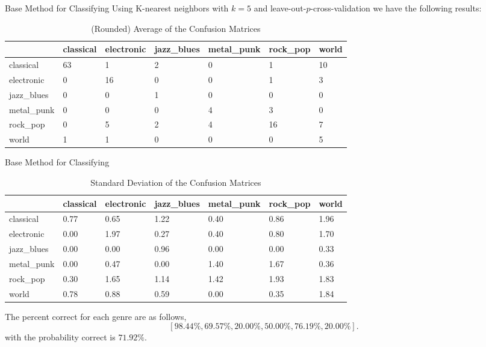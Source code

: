 \documentclass[xcolor=dvipsnames,t]{beamer} %
\begin{document}
\begin{frame}[shrink=20]{Base Method for Classifying}
Using K-nearest neighbors with $k=5$ and leave-out-$p$-cross-validation we have the following results:
\begin{table}[h!]
\centering
%
 \begin{tabular}{ l||l | l | l | l | l | l | }
 & classical & electronic & jazz\_blues & metal\_punk & rock\_pop & world\\\hline
classical & 63 &1 &2 &0 &1 &10 \\ \hline 
electronic & 0 &16 &0 &0 &1 &3 \\ \hline 
jazz\_blues & 0 &0 &1 &0 &0 &0 \\ \hline 
metal\_punk & 0 &0 &0 &4 &3 &0 \\ \hline 
rock\_pop & 0 &5 &2 &4 &16 &7 \\ \hline 
world & 1 &1 &0 &0 &0 &5 \\ \hline 
\end{tabular}

\caption{(Rounded) Average of the Confusion Matrices}
\label{fig:avgconfMat}
\end{table}
\end{frame}

\begin{frame}[shrink=20]{Base Method for Classifying}
\begin{table}[h!]
\centering
%
 \begin{tabular}{ l||l | l | l | l | l | l | }
 & classical & electronic & jazz\_blues & metal\_punk & rock\_pop & world\\\hline
classical & 0.77 &0.65 &1.22 &0.40 &0.86 &1.96 \\ \hline 
electronic & 0.00 &1.97 &0.27 &0.40 &0.80 &1.70 \\ \hline 
jazz\_blues & 0.00 &0.00 &0.96 &0.00 &0.00 &0.33 \\ \hline 
metal\_punk & 0.00 &0.47 &0.00 &1.40 &1.67 &0.36 \\ \hline 
rock\_pop & 0.30 &1.65 &1.14 &1.42 &1.93 &1.83 \\ \hline 
world & 0.78 &0.88 &0.59 &0.00 &0.35 &1.84 \\ \hline 
\end{tabular}

\caption{Standard Deviation of the Confusion Matrices}
\label{fig:stdconfMat}
\end{table}
The percent correct for each genre are as follows,
   \[ [98.44\%, 69.57\%,20.00\%,50.00\%,76.19\%,20.00\%]. \]
 with the probability correct is $71.92\%$.
\end{frame}
\end{document}
